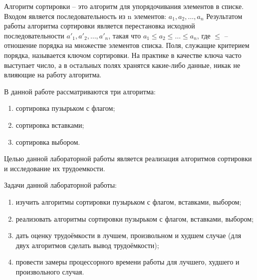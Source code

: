 \Introduction    
    Алгоритм сортировки -- это алгоритм для упорядочивания элементов в списке.
    Входом является последовательность из n элементов: $ a_1, a_2, \dots, a_n $
    Результатом работы алгоритма сортировки является перестановка
    исходной последовательности $ a'_1, a'_2, \dots, a'_n $,
    такая что $ a_1 \leqslant a_2 \leqslant \dots \leqslant a_n $, 
    где $ \leqslant $ -- отношение порядка на множестве элементов списка.
    Поля, служащие критерием порядка, называется ключом сортировки.
    На практике в качестве ключа часто выступает число,
    а в остальных полях хранятся какие-либо данные, 
    никак не влияющие на работу алгоритма.
    
    В данной работе рассматриваются три алгоритма:
    \begin{enumerate}
        \item сортировка пузырьком с флагом;
        \item сортировка вставками;
        \item сортировка выбором.
    \end{enumerate}

    Целью данной лабораторной работы является реализация алгоритмов сортировки и
    исследование их трудоемкости.

    Задачи данной лабораторной работы:
    \begin{enumerate}
        \item изучить алгоритмы сортировки пузырьком с флагом, вставками, выбором;
        \item реализовать алгоритмы сортировки пузырьком с флагом, вставками, выбором;
        \item дать оценку трудоёмкости в лучшем, произвольном и худшем случае (для двух алгоритмов сделать вывод трудоёмкости);
        \item провести замеры процессорного времени работы для лучшего, худшего и произвольного случая.
    \end{enumerate}

\newpage
